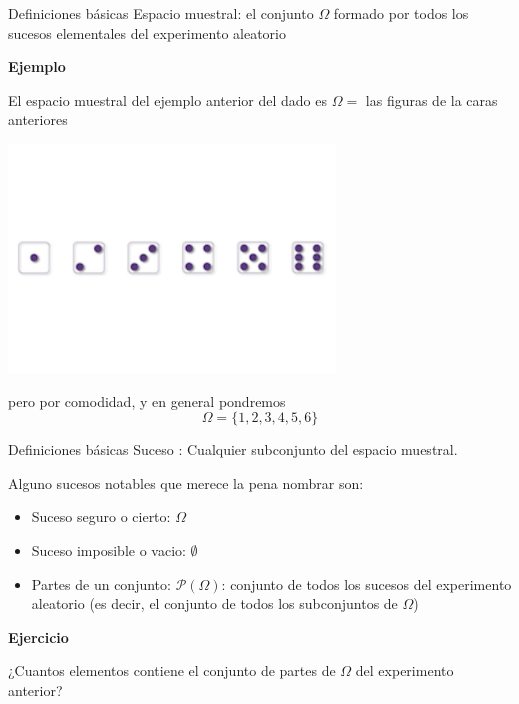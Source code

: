 \documentclass[
  ignorenonframetext,
  aspectratio=169]{beamer}
\providecommand{\tightlist}{%
  \setlength{\itemsep}{0pt}\setlength{\parskip}{0pt}}\usepackage{longtable,booktabs,array}
\begin{document}
\begin{frame}{Definiciones básicas}
\label{definiciones-buxe1sicas-1}
Espacio muestral: el conjunto \(\Omega\) formado por todos los sucesos
elementales del experimento aleatorio

\textbf{Ejemplo}

El espacio muestral del ejemplo anterior del dado es \(\Omega=\) las
figuras de la caras anteriores

\begin{center}
\includegraphics[width=0.65\textwidth,height=\textheight]{Tema_1_Probabilidad_error_files/figure-beamer/unnamed-chunk-2-1.pdf}
\end{center}

pero por comodidad, y en general pondremos \[\Omega = \{1,2,3,4,5,6\}\]
\end{frame}

\begin{frame}{Definiciones básicas}
\label{definiciones-buxe1sicas-2}
Suceso : Cualquier subconjunto del espacio muestral.

Alguno sucesos notables que merece la pena nombrar son:

\begin{itemize}
\tightlist
\item
  Suceso seguro o cierto: \(\Omega\)
\item
  Suceso imposible o vacio: \(\emptyset\)
\item
  Partes de un conjunto: \(\mathcal{P}(\Omega)\): conjunto de todos los
  sucesos del experimento aleatorio (es decir, el conjunto de todos los
  subconjuntos de \(\Omega\))
\end{itemize}

\textbf{Ejercicio}

¿Cuantos elementos contiene el conjunto de partes de \(\Omega\) del
experimento anterior?
\end{frame}
\end{document}
